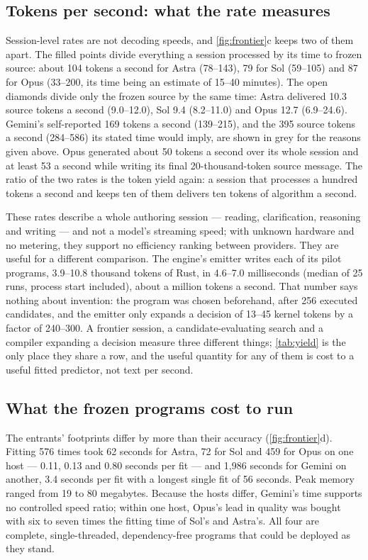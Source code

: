 \subsection{Tokens per second: what the rate measures}
\label{sec:throughput}

Session-level rates are not decoding speeds, and \cref{fig:frontier}c keeps two of them apart. The
filled points divide everything a session processed by its time to frozen source: about 104 tokens a
second for Astra (78--143), 79 for Sol (59--105) and 87 for Opus (33--200, its time being an estimate
of 15--40 minutes). The open diamonds divide only the frozen source by the same time: Astra delivered
10.3 source tokens a second (9.0--12.0), Sol 9.4 (8.2--11.0) and Opus 12.7 (6.9--24.6). Gemini's
self-reported 169 tokens a second (139--215), and the 395 source tokens a second (284--586) its stated
time would imply, are shown in grey for the reasons given above. Opus generated
about 50 tokens a second over its whole session and at least 53 a second while writing its final
20-thousand-token source message. The ratio of the two rates is the token yield again: a session
that processes a hundred tokens a second and keeps ten of them delivers ten tokens of algorithm a
second.

These rates describe a whole authoring session --- reading, clarification, reasoning and writing ---
and not a model's streaming speed; with unknown hardware and no metering, they support no
efficiency ranking between providers. They are useful for a different comparison. The engine's
emitter writes each of its pilot programs, 3.9--10.8 thousand tokens of Rust, in 4.6--7.0
milliseconds (median of 25 runs, process start included), about a million tokens a second. That
number says nothing about invention: the program was chosen beforehand, after 256 executed
candidates, and the emitter only expands a decision of 13--45 kernel tokens by a factor of 240--300.
A frontier session, a candidate-evaluating search and a compiler expanding a decision measure three
different things; \cref{tab:yield} is the only place they share a row, and the useful quantity for
any of them is cost to a useful fitted predictor, not text per second.

\subsection{What the frozen programs cost to run}

The entrants' footprints differ by more than their accuracy (\cref{fig:frontier}d). Fitting 576
times took 62 seconds for Astra, 72 for Sol and 459 for Opus on one host --- 0.11, 0.13 and 0.80
seconds per fit --- and 1,986 seconds for Gemini on another, 3.4 seconds per fit with a longest
single fit of 56 seconds. Peak memory ranged from 19 to 80 megabytes. Because the hosts differ,
Gemini's time supports no controlled speed ratio; within one host, Opus's lead in quality was bought
with six to seven times the fitting time of Sol's and Astra's. All four are complete, single-threaded,
dependency-free programs that could be deployed as they stand.

